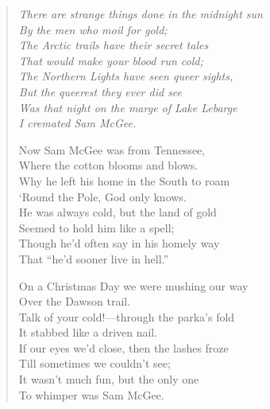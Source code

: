 
\begin{verse}
\textit{
There are strange things done in the midnight sun\\
\hspace*{2em}By the men who moil for gold;\\
The Arctic trails have their secret tales\\
\hspace*{2em}That would make your blood run cold;\\
The Northern Lights have seen queer sights,\\
\hspace*{2em}But the queerest they ever did see\\
Was that night on the marge of Lake Lebarge\\
\hspace*{2em}I cremated Sam McGee.
}

Now Sam McGee was from Tennessee,\\
\hspace*{2em}Where the cotton blooms and blows.\\
Why he left his home in the South to roam\\
\hspace*{2em}‘Round the Pole, God only knows.\\
He was always cold, but the land of gold\\
\hspace*{2em}Seemed to hold him like a spell;\\
Though he’d often say in his homely way\\
\hspace*{2em}That “he’d sooner live in hell.”

On a Christmas Day we were mushing our way\\
\hspace*{2em}Over the Dawson trail.\\
Talk of your cold!—through the parka’s fold\\
\hspace*{2em}It stabbed like a driven nail.\\
If our eyes we’d close, then the lashes froze\\
\hspace*{2em}Till sometimes we couldn’t see;\\
It wasn’t much fun, but the only one\\
\hspace*{2em}To whimper was Sam McGee.


\end{verse}
